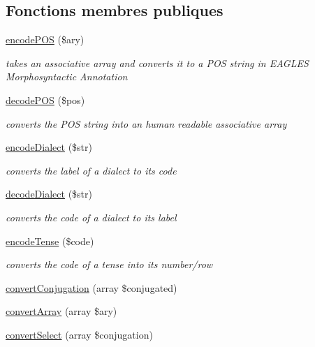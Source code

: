 \subsection*{Fonctions membres publiques}
\begin{DoxyCompactItemize}
\item 
\hyperlink{classConverterIndexation_a8b52ecc585f7423456ae6aaf5df2436f}{encode\+P\+OS} (\$ary)
\begin{DoxyCompactList}\small\item\em takes an associative array and converts it to a P\+OS string in E\+A\+G\+L\+ES Morphosyntactic Annotation \end{DoxyCompactList}\item 
\hyperlink{classConverterIndexation_a6012e4df4619a7cc1c55c811fc50690d}{decode\+P\+OS} (\$pos)
\begin{DoxyCompactList}\small\item\em converts the P\+OS string into an human readable associative array \end{DoxyCompactList}\item 
\hyperlink{classConverterIndexation_ab9501f7ab3dad7daa338023522f03949}{encode\+Dialect} (\$str)
\begin{DoxyCompactList}\small\item\em converts the label of a dialect to its code \end{DoxyCompactList}\item 
\hyperlink{classConverterIndexation_a138e9e08f03d5a14fc53d367c9c739de}{decode\+Dialect} (\$str)
\begin{DoxyCompactList}\small\item\em converts the code of a dialect to its label \end{DoxyCompactList}\item 
\hyperlink{classConverterIndexation_aeabe347658ec9c09bf8ca65262ef6fa8}{encode\+Tense} (\$code)
\begin{DoxyCompactList}\small\item\em converts the code of a tense into its number/row \end{DoxyCompactList}\item 
\hyperlink{classConverterIndexation_a3d6b48ec5eaf46b9a2a8b3bdc200e063}{convert\+Conjugation} (array \$conjugated)
\item 
\hyperlink{classConverterIndexation_a171eb2b7d4d6452218212da881972dfd}{convert\+Array} (array \$ary)
\item 
\hyperlink{classConverterIndexation_a066755523513b6c4197765c631c7b248}{convert\+Select} (array \$conjugation)
\end{DoxyCompactItemize}


